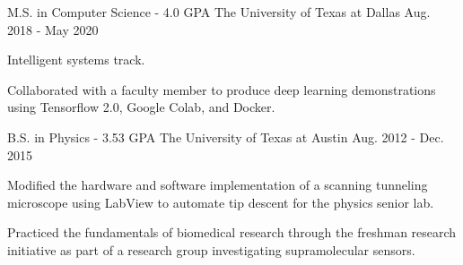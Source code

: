 

\begin{cventries}
  \cventry
    {M.S. in Computer Science - 4.0 GPA} %
    {The University of Texas at Dallas} %
    {Aug. 2018 - May 2020} %
    {} %
    {
      \begin{cvitems} %
        \item {Intelligent systems track.}
        \item {
			Collaborated with a faculty member to produce deep learning
			demonstrations using Tensorflow 2.0, Google Colab, and Docker.
		}
      \end{cvitems}
    }
  \cventry
    {B.S. in Physics - 3.53 GPA} %
    {The University of Texas at Austin} %
    {Aug. 2012 - Dec. 2015} %
    {} %
    {
      \begin{cvitems} %
        \item {
			Modified the hardware and software implementation of a scanning
			tunneling microscope using LabView to automate tip descent for
			the physics senior lab.
		}
        \item {
			Practiced the fundamentals of biomedical research through the
			freshman research initiative as part of a research group
			investigating supramolecular sensors.
		}
      \end{cvitems}
    }
\end{cventries}
